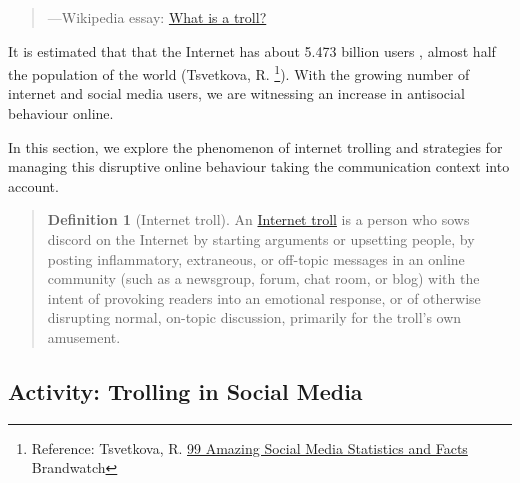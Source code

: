 \documentclass[
]{book}
\theoremstyle{definition}
\newtheorem{definition}{Definition}[chapter]
\theoremstyle{definition}
\theoremstyle{definition}
\theoremstyle{definition}
\theoremstyle{remark}
\begin{document}
\begin{quote}
---Wikipedia essay: \href{https://meta.wikimedia.org/wiki/What_is_a_troll\%3F}{What is a troll?}
\end{quote}

It is estimated that that the Internet has about 5.473 billion users , almost half the population of the world (Tsvetkova, R. \footnote{Reference: Tsvetkova, R. \href{https://www.brandwatch.com/blog/amazing-social-media-statistics-and-facts/}{99 Amazing Social Media Statistics and Facts} Brandwatch}). With the growing number of internet and social media users, we are witnessing an increase in antisocial behaviour online.

In this section, we explore the phenomenon of internet trolling and strategies for managing this disruptive online behaviour taking the communication context into account.

\begin{quote}
\begin{definition}[Internet troll]
\protect\hypertarget{def:troll}{}\label{def:troll}An \href{https://en.wikipedia.org/wiki/Troll_(slang)}{Internet troll} is a person who sows discord on the Internet by starting arguments or upsetting people, by posting inflammatory, extraneous, or off-topic messages in an online community (such as a newsgroup, forum, chat room, or blog) with the intent of provoking readers into an emotional response, or of otherwise disrupting normal, on-topic discussion, primarily for the troll's own amusement.
\end{definition}
\end{quote}

\hypertarget{activity-trolling-in-social-media}{%
\subsection*{Activity: Trolling in Social Media}\label{activity-trolling-in-social-media}}
\end{document}
